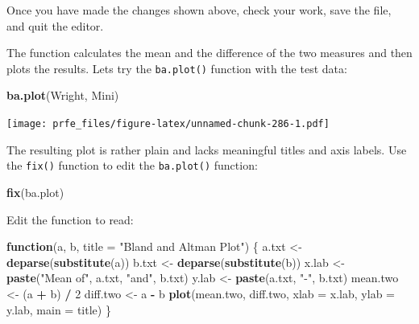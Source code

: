 \documentclass[12pt,a4paper]{book}
\newenvironment{Shaded}{\begin{snugshade}}{\end{snugshade}}
\newcommand{\KeywordTok}[1]{\textcolor[rgb]{0.13,0.29,0.53}{\textbf{#1}}}
\newcommand{\DataTypeTok}[1]{\textcolor[rgb]{0.13,0.29,0.53}{#1}}
\newcommand{\DecValTok}[1]{\textcolor[rgb]{0.00,0.00,0.81}{#1}}
\newcommand{\StringTok}[1]{\textcolor[rgb]{0.31,0.60,0.02}{#1}}
\newcommand{\ControlFlowTok}[1]{\textcolor[rgb]{0.13,0.29,0.53}{\textbf{#1}}}
\newcommand{\OperatorTok}[1]{\textcolor[rgb]{0.81,0.36,0.00}{\textbf{#1}}}
\newcommand{\NormalTok}[1]{#1}
\theoremstyle{definition}
\theoremstyle{definition}
\theoremstyle{definition}
\theoremstyle{remark}
\begin{document}
Once you have made the changes shown above, check your work, save the
file, and quit the editor.

The function calculates the mean and the difference of the two measures
and then plots the results. Lets try the \texttt{ba.plot()} function
with the test data:

\begin{Shaded}
\begin{Highlighting}[]
\KeywordTok{ba.plot}\NormalTok{(Wright, Mini)}
\end{Highlighting}
\end{Shaded}

\texttt{[image: prfe\_files/figure-latex/unnamed-chunk-286-1.pdf]}

The resulting plot is rather plain and lacks meaningful titles and axis
labels. Use the \texttt{fix()} function to edit the \texttt{ba.plot()}
function:

\begin{Shaded}
\begin{Highlighting}[]
\KeywordTok{fix}\NormalTok{(ba.plot)}
\end{Highlighting}
\end{Shaded}

Edit the function to read:

\begin{Shaded}
\begin{Highlighting}[]
\ControlFlowTok{function}\NormalTok{(a, b, }\DataTypeTok{title =} \StringTok{"Bland and Altman Plot"}\NormalTok{) \{}
\NormalTok{  a.txt <-}\StringTok{ }\KeywordTok{deparse}\NormalTok{(}\KeywordTok{substitute}\NormalTok{(a))}
\NormalTok{  b.txt <-}\StringTok{ }\KeywordTok{deparse}\NormalTok{(}\KeywordTok{substitute}\NormalTok{(b))}
\NormalTok{  x.lab <-}\StringTok{ }\KeywordTok{paste}\NormalTok{(}\StringTok{"Mean of"}\NormalTok{, a.txt, }\StringTok{"and"}\NormalTok{, b.txt)}
\NormalTok{  y.lab <-}\StringTok{ }\KeywordTok{paste}\NormalTok{(a.txt, }\StringTok{"-"}\NormalTok{, b.txt)}
\NormalTok{  mean.two <-}\StringTok{ }\NormalTok{(a }\OperatorTok{+}\StringTok{ }\NormalTok{b) }\OperatorTok{/}\StringTok{ }\DecValTok{2}
\NormalTok{  diff.two <-}\StringTok{ }\NormalTok{a }\OperatorTok{-}\StringTok{ }\NormalTok{b}
  \KeywordTok{plot}\NormalTok{(mean.two, diff.two, }\DataTypeTok{xlab =}\NormalTok{ x.lab, }\DataTypeTok{ylab =}\NormalTok{ y.lab, }\DataTypeTok{main =}\NormalTok{ title)}
\NormalTok{\}}
\end{Highlighting}
\end{Shaded}
\end{document}
